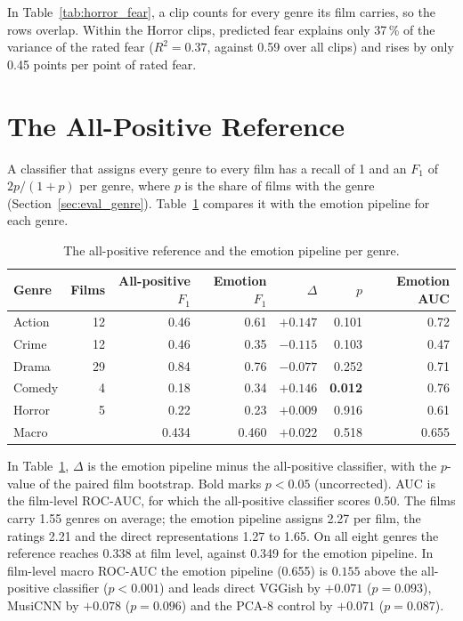 In Table~\ref{tab:horror_fear}, a clip counts for every genre its film carries, so the rows
overlap. Within the Horror clips, predicted fear explains only 37\,\% of the variance of the
rated fear ($R^2=0.37$, against 0.59 over all clips) and rises by only 0.45 points per point of
rated fear.

\section{The All-Positive Reference}
\label{sec:app_floor}

A classifier that assigns every genre to every film has a recall of 1 and an $F_1$ of
$2p/(1+p)$ per genre, where $p$ is the share of films with the genre
(Section~\ref{sec:eval_genre}). Table~\ref{tab:app_floor} compares it with the emotion
pipeline for each genre.

\begin{table}[H]
  \centering
  \small
  \caption{The all-positive reference and the emotion pipeline per genre.}
  \label{tab:app_floor}
  \begin{tabular}{lrrrrrr}
    \toprule
    Genre & Films & All-positive $F_1$ & Emotion $F_1$ & $\Delta$ & $p$ & Emotion AUC \\
    \midrule
    Action & 12 & 0.46 & 0.61 & $+0.147$ & 0.101 & 0.72 \\
    Crime  & 12 & 0.46 & 0.35 & $-0.115$ & 0.103 & 0.47 \\
    Drama  & 29 & 0.84 & 0.76 & $-0.077$ & 0.252 & 0.71 \\
    Comedy & 4  & 0.18 & 0.34 & $+0.146$ & \textbf{0.012} & 0.76 \\
    Horror & 5  & 0.22 & 0.23 & $+0.009$ & 0.916 & 0.61 \\
    \midrule
    Macro  &    & 0.434 & 0.460 & $+0.022$ & 0.518 & 0.655 \\
    \bottomrule
  \end{tabular}
\end{table}

In Table~\ref{tab:app_floor}, $\Delta$ is the emotion pipeline minus the all-positive
classifier, with the $p$-value of the paired film bootstrap. Bold marks $p<0.05$ (uncorrected). AUC is the
film-level ROC-AUC, for which the all-positive classifier scores 0.50. The films carry 1.55
genres on average; the emotion pipeline assigns 2.27 per film, the ratings 2.21 and the
direct representations 1.27 to 1.65. On all eight genres the reference reaches 0.338 at film level, against 0.349 for the emotion
pipeline. In film-level macro ROC-AUC the emotion pipeline (0.655) is $0.155$ above the all-positive
classifier ($p<0.001$) and leads direct VGGish by
$+0.071$ ($p=0.093$), MusiCNN by $+0.078$ ($p=0.096$) and the PCA-8 control by $+0.071$
($p=0.087$).

